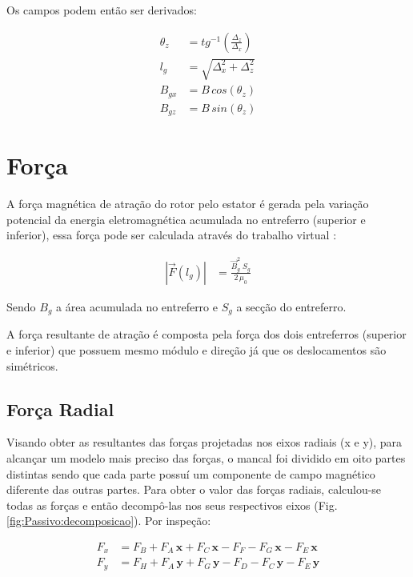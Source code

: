 Os campos podem então ser derivados:

\begin{align}
\theta_z &= tg^{-1}(\frac{\Delta_z}{\Delta_x}) \\
l_g &= \sqrt{\Delta_x^2 + \Delta_z^2} \\
B_{gx} &= B \, cos(\theta_z) \\
B_{gz} &= B \, sin(\theta_z) 
\end{align}


\section{Força}

A força magnética de atração do rotor pelo estator é gerada pela variação potencial da energia eletromagnética acumulada no entreferro (superior e inferior), essa força pode ser calculada através do trabalho virtual \citep{Chiba}:

\begin{align}
|\vec{F}(l_g)| &=  \frac{ \vec{B}_{g}^2 \; S_g}{2 \, \mu_0} \label{eq:passivo:Fx}
\end{align}

Sendo $B_g$ a área acumulada no entreferro e $S_g$ a secção do entreferro.

A força resultante de atração é composta pela força dos dois entreferros (superior e inferior) que possuem mesmo módulo e direção já que os deslocamentos são simétricos. 

\subsection{Força Radial} \label{subsection:forca:x}


Visando obter as resultantes das forças projetadas nos eixos radiais (x e y), para alcançar um modelo mais preciso das forças, o mancal foi dividido em oito partes distintas sendo que cada parte possuí um componente de campo magnético diferente das outras partes. Para obter o valor das forças radiais, calculou-se todas as forças e então decompô-las nos seus respectivos eixos (Fig. \ref{fig:Passivo:decomposicao}). Por inspeção:

\begin{align}
F_{x} &= F_{B} + F_{A} \, \boldsymbol{x} + F_{C} \, \boldsymbol{x} - F_{F} - F_{G} \, \boldsymbol{x}  - F_{E} \, \boldsymbol{x} \label{eq:p:F:resultante:x} \\
F_{y} &= F_{H} + F_{A} \, \boldsymbol{y} + F_{G} \, \boldsymbol{y} - F_{D} - F_{C} \, \boldsymbol{y}  - F_{E} \, \boldsymbol{y}
\label{eq:p:F:resultante:y} 
\end{align}

